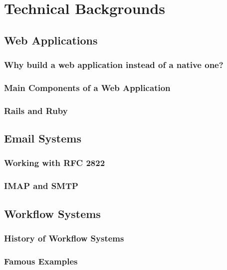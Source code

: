 \chapter{Technical Backgrounds}
\label{chapter:technical}

\section{Web Applications}
\subsection{Why build a web application instead of a native one?}
\subsection{Main Components of a Web Application}
\subsection{Rails and Ruby}

\section{Email Systems}
\subsection{Working with RFC 2822}
\subsection{IMAP and SMTP}

\section{Workflow Systems}
\subsection{History of Workflow Systems}
\subsection{Famous Examples}
